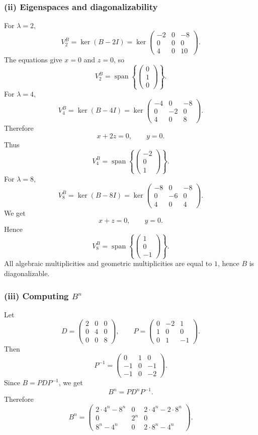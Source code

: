 \documentclass[11pt,a4paper]{article}
\newcommand{\Span}{\operatorname{span}}
\begin{document}
\subsubsection*{(ii) Eigenspaces and diagonalizability}
For $\lambda=2$,
\[
V_2^B=\ker(B-2I)=\ker\begin{pmatrix}
-2&0&-8\\
0&0&0\\
4&0&10
\end{pmatrix}.
\]
The equations give $x=0$ and $z=0$, so
\[
V_2^B=\Span\left\{\begin{pmatrix}0\\1\\0\end{pmatrix}\right\}.
\]
For $\lambda=4$,
\[
V_4^B=\ker(B-4I)=\ker\begin{pmatrix}
-4&0&-8\\
0&-2&0\\
4&0&8
\end{pmatrix}.
\]
Therefore
\[
x+2z=0,
\qquad y=0.
\]
Thus
\[
V_4^B=\Span\left\{\begin{pmatrix}-2\\0\\1\end{pmatrix}\right\}.
\]
For $\lambda=8$,
\[
V_8^B=\ker(B-8I)=\ker\begin{pmatrix}
-8&0&-8\\
0&-6&0\\
4&0&4
\end{pmatrix}.
\]
We get
\[
x+z=0,
\qquad y=0.
\]
Hence
\[
V_8^B=\Span\left\{\begin{pmatrix}1\\0\\-1\end{pmatrix}\right\}.
\]
All algebraic multiplicities and geometric multiplicities are equal to $1$, hence $B$ is diagonalizable.

\subsubsection*{(iii) Computing $B^n$}
Let
\[
D=\begin{pmatrix}
2&0&0\\
0&4&0\\
0&0&8
\end{pmatrix},
\qquad
P=\begin{pmatrix}
0&-2&1\\
1&0&0\\
0&1&-1
\end{pmatrix}.
\]
Then
\[
P^{-1}=\begin{pmatrix}
0&1&0\\
-1&0&-1\\
-1&0&-2
\end{pmatrix}.
\]
Since $B=PDP^{-1}$, we get
\[
B^n=PD^nP^{-1}.
\]
Therefore
\[
B^n=
\begin{pmatrix}
2\cdot4^n-8^n&0&2\cdot4^n-2\cdot8^n\\
0&2^n&0\\
8^n-4^n&0&2\cdot8^n-4^n
\end{pmatrix}.
\]
\end{document}
